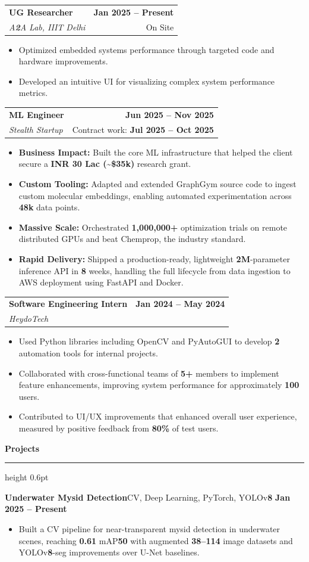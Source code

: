 \documentclass[10pt,letterpaper]{article}
\makeatletter
\newcommand{\sectiontitle}[1]{%
  \vspace{3pt}
  {\normalsize\bfseries\color{accent} #1}\par
  \vspace{1pt}
  {\color{accent}\hrule height 0.6pt}
  \vspace{2pt}
}
\newcommand{\entry}[4]{%
  \begin{tabularx}{\textwidth}{@{}X r@{}}
    {\bfseries #1} & {\footnotesize\bfseries #2} \\
    {\footnotesize\textit{#3}} & {\footnotesize #4}
  \end{tabularx}
  \vspace{1pt}
}
\newcommand{\projectentry}[2]{%
  {\bfseries #1}\hfill{\footnotesize #2}\par
  \vspace{1pt}
}
\newenvironment{tightitems}{%
  \begin{itemize}
    \setlength{\itemsep}{0pt}
    \setlength{\parskip}{0pt}
    \setlength{\parsep}{0pt}
    \setlength{\topsep}{1pt}
    \setlength{\leftmargin}{12pt}
}{%
  \end{itemize}
  \vspace{0pt}
}
\makeatother
\begin{document}
\entry{UG Researcher}{\textbf{Jan 2025 -- Present}}{A\textbf{2}A Lab, IIIT Delhi}{On Site}
\begin{tightitems}
  \item Optimized embedded systems performance through targeted code and hardware improvements.
  \item Developed an intuitive UI for visualizing complex system performance metrics.
\end{tightitems}

\entry{ML Engineer}{\textbf{Jun 2025 -- Nov 2025}}{Stealth Startup}{Contract work: \textbf{Jul 2025 -- Oct 2025}}
\begin{tightitems}
  \item \textbf{Business Impact:} Built the core ML infrastructure that helped the client secure a \textbf{INR 30 Lac (\textasciitilde{}\$35k)} research grant.
  \item \textbf{Custom Tooling:} Adapted and extended GraphGym source code to ingest custom molecular embeddings, enabling automated experimentation across \textbf{48k} data points.
  \item \textbf{Massive Scale:} Orchestrated \textbf{1,000,000+} optimization trials on remote distributed GPUs and beat Chemprop, the industry standard.
  \item \textbf{Rapid Delivery:} Shipped a production-ready, lightweight \textbf{2M}-parameter inference API in \textbf{8} weeks, handling the full lifecycle from data ingestion to AWS deployment using FastAPI and Docker.
\end{tightitems}

\entry{Software Engineering Intern}{\textbf{Jan 2024 -- May 2024}}{HeydoTech}{}
\begin{tightitems}
  \item Used Python libraries including OpenCV and PyAutoGUI to develop \textbf{2} automation tools for internal projects.
  \item Collaborated with cross-functional teams of \textbf{5+} members to implement feature enhancements, improving system performance for approximately \textbf{100} users.
  \item Contributed to UI/UX improvements that enhanced overall user experience, measured by positive feedback from \textbf{80\%} of test users.
\end{tightitems}

\sectiontitle{Projects}

\projectentry{Underwater Mysid Detection}{CV, Deep Learning, PyTorch, YOLOv\textbf{8} \textbar{} \textbf{Jan 2025 -- Present}}
\begin{tightitems}
  \item Built a CV pipeline for near-transparent mysid detection in underwater scenes, reaching \textbf{0.61} mAP\textbf{50} with augmented \textbf{38--114} image datasets and YOLOv\textbf{8}-seg improvements over U-Net baselines.
\end{tightitems}
\end{document}
